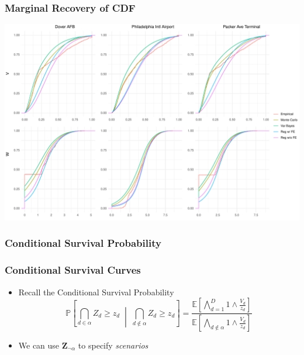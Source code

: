 \documentclass[aspectratio=169,10pt]{beamer}
\newlength{\frametextheight}
\begin{document}
\begin{frame}
    \frametitle{Marginal Recovery of CDF}
    \begin{center}
        \includegraphics[height=0.99\frametextheight]{./ch3/plots/delaware_marginal_cdfs}
    \end{center}
\end{frame} %

\subsubsection{Conditional Survival Probability}

\begin{frame}
    \frametitle{Conditional Survival Curves}
    \begin{itemize}
        \item Recall the Conditional Survival Probability
        \[
        \mathbb{P}\left[\bigcap_{d\in\alpha}Z_d \geq z_d\;\middle|\;
            \bigcap_{d\not\in\alpha}Z_d \geq z_d\right] =
        \frac{
            \mathbb{E}\left[\bigwedge_{d=1}^D 1\wedge \frac{V_d}{z_d}\right]
        }{
            \mathbb{E}\left[\bigwedge_{d\not\in\alpha} 1\wedge \frac{V_d}{z_d}\right]
        }
        \]
        \item We can use $\bm{Z}_{\neg\alpha}$ to specify \emph{scenarios}
    \end{itemize}
\end{frame} %
\end{document}
